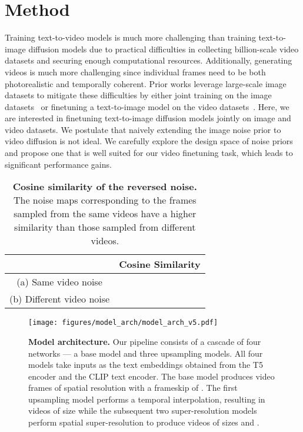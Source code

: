 \documentclass[10pt,twocolumn,letterpaper]{article}
\newcommand{\new}[1]{#1}
\newcommand{\tabcspace}{\vspace{-2mm}}
\begin{document}
\section{Method}\label{sec:method}

Training text-to-video models is much more challenging than training text-to-image diffusion models due to practical difficulties in collecting billion-scale video datasets and securing enough computational resources. Additionally, generating videos is much more challenging since individual frames need to be both photorealistic and temporally coherent. Prior works leverage large-scale image datasets to mitigate these difficulties by either joint training on the image datasets~\cite{wu2022nuwa,ho2022video,ho2022imagen} or finetuning a text-to-image model on the video datasets~\cite{hong2022cogvideo,singer2022make}. Here, we are interested in finetuning text-to-image diffusion models jointly on image and video datasets. We postulate that naively extending the image noise prior to video diffusion is not ideal. We carefully explore the design space of noise priors and propose one that is well suited for our video finetuning task, which leads to significant performance gains. 


\setlength{\tabcolsep}{8pt}
\renewcommand{\arraystretch}{1}
\begin{table}[t]
    \centering
    \caption{\new{\textbf{Cosine similarity of the reversed noise.} The noise maps corresponding to the frames sampled from the same videos have a higher similarity than those sampled from different videos.}}
    \label{tab:cosine_sim}
    \tabcspace
    \begin{tabular}{c|c}
    \toprule
     & Cosine Similarity                          \\
    \midrule
    (a) Same video noise      & \small{} \\
    (b) Different video noise & \small{} \\
    \bottomrule
    \end{tabular}
\end{table}

\begin{figure*}[t!]
    \centering
    \texttt{[image: figures/model\_arch/model\_arch\_v5.pdf]}
    \caption{\textbf{Model architecture.} Our pipeline consists of a cascade of four networks --- a base model and three upsampling models. All four models take inputs as the text embeddings obtained from the T5 encoder and the CLIP text encoder. The base model produces  video frames of spatial resolution  with a frameskip of . The first upsampling model performs a temporal interpolation, resulting in videos of size  while the subsequent two super-resolution models perform spatial super-resolution to produce videos of sizes  and .}
    \label{fig:model_arch}
    \vspace{-0.2cm}
\end{figure*} 
\end{document}
